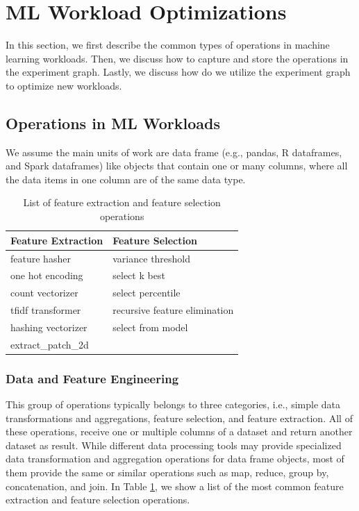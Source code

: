 \section{ML Workload Optimizations} \label{sec-ml-workloads}
In this section, we first describe the common types of operations in machine learning workloads.
Then, we discuss how to capture and store the operations in the experiment graph.
Lastly, we discuss how do we utilize the experiment graph to optimize new workloads.

\subsection{Operations in ML Workloads}
We assume the main units of work are data frame (e.g., pandas, R dataframes, and Spark dataframes) like objects that contain one or many columns, where all the data items in one column are of the same data type.
\begin{table}
\centering
\begin{tabular}{ll}
\hline
	   Feature Extraction & Feature Selection\\ \hline
        feature hasher & variance threshold  \\
        one hot encoding & select k best \\
        count vectorizer& select percentile \\ 
        tfidf transformer & recursive feature elimination \\
        hashing vectorizer & select from model \\
        extract\_patch\_2d &  \\
        \hline
\end{tabular}
\caption{List of feature extraction and feature selection operations}\label{feature-engineering-operations}
\end{table}

\subsubsection{Data and Feature Engineering}
This group of operations typically belongs to three categories, i.e., simple data transformations and aggregations, feature selection, and feature extraction.
All of these operations, receive one or multiple columns of a dataset and return another dataset as result. 
While different data processing tools may provide specialized data transformation and aggregation operations for data frame objects, most of them provide the same or similar operations such as map, reduce, group by, concatenation, and join. 
In Table \ref{feature-engineering-operations}, we show a list of the most common feature extraction and feature selection operations.

